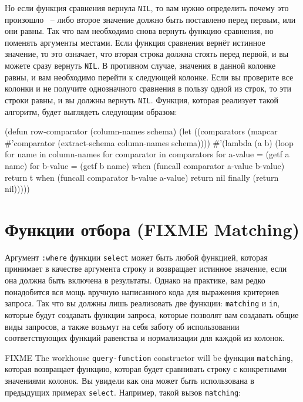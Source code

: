 Но если функция сравнения вернула \lstinline{NIL}, то вам нужно определить почему это произошло
~-- либо второе значение должно быть поставлено перед первым, или они равны.  Так что вам
необходимо снова вернуть функцию сравнения, но поменять аргументы местами.  Если функция
сравнения вернёт истинное значение, то это означает, что вторая строка должна стоять перед
первой, и вы можете сразу вернуть \lstinline{NIL}.  В противном случае, значения в данной
колонке равны, и вам необходимо перейти к следующей колонке.  Если вы проверите все
колонки и не получите однозначного сравнения в пользу одной из строк, то эти строки равны,
и вы должны вернуть \lstinline{NIL}.  Функция, которая реализует такой алгоритм, будет
выглядеть следующим образом:

\begin{myverb}
(defun row-comparator (column-names schema)
  (let ((comparators (mapcar #'comparator (extract-schema column-names schema))))
    #'(lambda (a b)
        (loop
           for name in column-names
           for comparator in comparators
           for a-value = (getf a name)
           for b-value = (getf b name)
           when (funcall comparator a-value b-value) return t
           when (funcall comparator b-value a-value) return nil
           finally (return nil)))))
\end{myverb}

\section{Функции отбора (FIXME Matching)}

Аргумент \lstinline{:where} функции \lstinline{select} может быть любой функцией, которая принимает
в качестве аргумента строку и возвращает истинное значение, если она должна быть включена
в результаты.  Однако на практике, вам редко понадобится вся мощь вручную написанного кода
для выражения критериев запроса.  Так что вы должны лишь реализовать две функции:
\lstinline{matching} и \lstinline{in}, которые будут создавать функции запроса, которые позволят вам
создавать общие виды запросов, а также возьмут на себя заботу об использовании
соответствующих функций равенства и нормализации для каждой из колонок.

FIXME The workhouse \lstinline{query-function} constructor will be функция \lstinline{matching},
которая возвращает функцию, которая будет сравнивать строку с конкретными значениями
колонок.  Вы увидели как она может быть использована в предыдущих примерах \lstinline{select}.
Например, такой вызов \lstinline{matching}:

